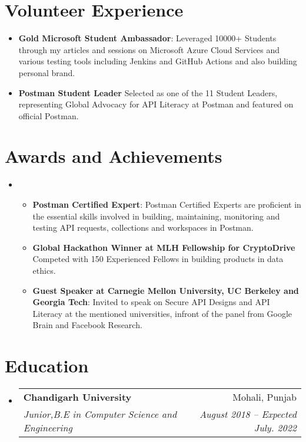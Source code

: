 \documentclass[letterpaper,11pt]{article}
\makeatletter
\newcommand{\resumeItem}[1]{
  \item\small{
    {#1 \vspace{-2pt}}
  }
}
\newcommand{\resumeSubheading}[4]{
  \vspace{-2pt}\item
    \begin{tabular*}{0.97\textwidth}[t]{l@{\extracolsep{\fill}}r}
      \textbf{#1} & #2 \\
      \textit{\small#3} & \textit{\small #4} \\
    \end{tabular*}\vspace{-7pt}
}
\newcommand{\resumeSubHeadingListStart}{\begin{itemize}[leftmargin=0.15in, label={}]}
\newcommand{\resumeSubHeadingListEnd}{\end{itemize}}
\newcommand{\resumeItemListStart}{\begin{itemize}}
\newcommand{\resumeItemListEnd}{\end{itemize}\vspace{-5pt}}
\makeatother
\begin{document}
\section{Volunteer Experience}
 \begin{itemize}[leftmargin=0.15in, label={}]
    \small{\item{
        \resumeItemListStart
        \resumeItem{\textbf{Gold Microsoft Student Ambassador}: Leveraged 10000+ Students through my  articles and sessions on Microsoft Azure Cloud Services and various testing tools including Jenkins and GitHub Actions and also building personal brand.}
        \resumeItem{\textbf{Postman Student Leader} Selected as one of the 11 Student Leaders, representing Global Advocacy for API Literacy at Postman and featured on official Postman.}
      \resumeItemListEnd
    }}
 \end{itemize}

\section{Awards and Achievements}
 \begin{itemize}[leftmargin=0.15in, label={}]
    \small\item{\resumeItemListStart
           \resumeItem{\textbf{Postman Certified Expert}: Postman Certified Experts are proficient in the essential skills involved in building, maintaining, monitoring and testing API requests, collections and workspaces in Postman. }
        \resumeItem{\textbf{Global Hackathon Winner at MLH Fellowship for CryptoDrive} Competed with 150 Experienced Fellows in building products in data ethics. }
        \resumeItem{\textbf{Guest Speaker at Carnegie Mellon University, UC Berkeley and Georgia Tech}: Invited to speak on Secure API Designs and API Literacy at the mentioned universities, infront of the panel from Google Brain and Facebook Research.}
      \resumeItemListEnd
    }
 \end{itemize}
 
\section{Education}
  \resumeSubHeadingListStart
    \resumeSubheading
      {Chandigarh University}{Mohali, Punjab}
      {Junior,B.E in Computer Science and Engineering}{August 2018 -- Expected July. 2022}
  \resumeSubHeadingListEnd
\end{document}
